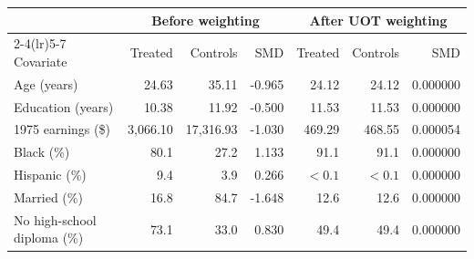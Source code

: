 \begin{tabular}{@{}lrrrrrr@{}}
\toprule
& \multicolumn{3}{c}{Before weighting} & \multicolumn{3}{c}{After UOT weighting}\\
\cmidrule(lr){2-4}\cmidrule(lr){5-7}
Covariate & Treated & Controls & SMD & Treated & Controls & SMD\\
\midrule
Age (years) & 24.63 & 35.11 & -0.965 & 24.12 & 24.12 & 0.000000 \\
Education (years) & 10.38 & 11.92 & -0.500 & 11.53 & 11.53 & 0.000000 \\
1975 earnings (\$) & 3,066.10 & 17,316.93 & -1.030 & 469.29 & 468.55 & 0.000054 \\
Black (\%) & 80.1 & 27.2 & 1.133 & 91.1 & 91.1 & 0.000000 \\
Hispanic (\%) & 9.4 & 3.9 & 0.266 & $<0.1$ & $<0.1$ & 0.000000 \\
Married (\%) & 16.8 & 84.7 & -1.648 & 12.6 & 12.6 & 0.000000 \\
No high-school diploma (\%) & 73.1 & 33.0 & 0.830 & 49.4 & 49.4 & 0.000000 \\
\bottomrule
\end{tabular}
